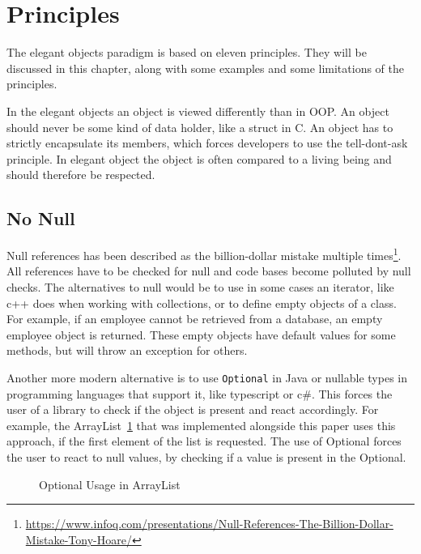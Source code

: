 \section{Principles}\label{sec:principles}
The elegant objects paradigm is based on eleven principles.
They will be discussed in this chapter, along with some examples and some limitations of the principles.

In the elegant objects an object is viewed differently than in \Gls{OOP}.
An object should never be some kind of data holder, like a struct in C\@.
An object has to strictly encapsulate its members, which forces developers to use the tell-dont-ask principle.
In elegant object the object is often compared to a living being and should therefore be respected.\cite{tell-dont-ask-martin-fowler,elegant-objects}

\subsection{No Null}\label{subsec:no-null}
Null references has been described as the billion-dollar mistake multiple times\footnote{\url{https://www.infoq.com/presentations/Null-References-The-Billion-Dollar-Mistake-Tony-Hoare/}}.
All references have to be checked for null and code bases become polluted by null checks.
The alternatives to null would be to use in some cases an iterator, like c++ does when working with collections, or to define empty objects of a class.
For example, if an employee cannot be retrieved from a database, an empty employee object is returned.
These empty objects have default values for some methods, but will throw an exception for others.

Another more modern alternative is to use \texttt{Optional} in Java or nullable types in programming languages that support it, like typescript or c\#.
This forces the user of a library to check if the object is present and react accordingly.
For example, the ArrayList\ \ref{fig:optional-usage} that was implemented alongside this paper uses this approach, if the first element of the list is requested.
The use of Optional forces the user to react to null values, by checking if a value is present in the Optional.

\begin{figure}[h]
    \caption{Optional Usage in ArrayList}
    
    \label{fig:optional-usage}
\end{figure}

